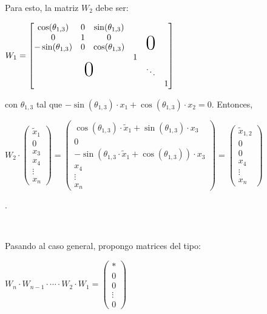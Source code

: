\documentclass[]{article}
\begin{document}
Para esto, la matriz $W_2$ debe ser:
\begin{center}
	$W_1=\begin{bmatrix}
		 \cos(\theta_{1,3}) & 0 	& 	\sin(\theta_{1,3})	&		&		&		\\
		 0 & 1 & 0 & & & \\[-8pt]
		-\sin(\theta_{1,3}) & 0 &\cos(\theta_{1,3})	&		&\gran{0}&		\\
		&	 			&					&1		&		&		\\
		&\hspace{0cm}\gran{0}\hspace{-0.5cm}	&					&		&\ddots &		\\
	&					&					&		&		&1

	\end{bmatrix}$
\end{center}

con $\theta_{1,3}$ tal que $-\sin(\theta_{1,3})\cdot x_1 + \cos(\theta_{1,3})\cdot x_2 =0$. Entonces,

\begin{center}
	$W_2 \cdot \begin{pmatrix}
		\tilde x_1\\
		0\\
		x_3\\
		x_4\\
		\vdots \\
		x_n
	\end{pmatrix} = \begin{pmatrix}
		\cos(\theta_{1,3})\cdot \tilde x_1 + \sin(\theta_{1,3})\cdot x_3 \\
		0\\
		-\sin(\theta_{1,3}\cdot \tilde x_1 + \cos(\theta_{1,3}))\cdot x_3 \\
		x_4\\
		\vdots \\
		x_n
	\end{pmatrix} = \begin{pmatrix}
		\tilde x_{1,2}\\
		0\\
		0\\
		x_4\\
		\vdots \\
		x_n
	\end{pmatrix}$
\end{center}.

~\newline
~\newline

Pasando al caso general, propongo matrices del tipo:
\begin{center}
	$W_n\cdot W_{n-1} \cdot \cdots \cdot W_2 \cdot W_1 = \begin{pmatrix}
		* \\ 0 \\ 0 \\ \vdots \\ 0
	\end{pmatrix}$
\end{center}
\end{document}
